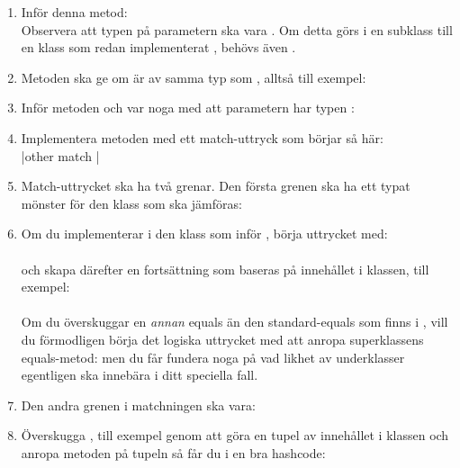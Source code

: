 \begin{enumerate}[leftmargin=*]
\item Inför denna metod: \\Observera att typen på parametern ska vara . Om detta görs i en subklass till en klass som redan implementerat , behövs även .

\item Metoden  ska ge  om  är av samma typ som , alltså till exempel: \\

\item Inför metoden  och var noga med att parametern har typen : \\ 

\item Implementera metoden  med ett match-uttryck som börjar så här: \\
\code|other match |

\item Match-uttrycket ska ha två grenar. Den första grenen ska ha ett typat mönster för den klass som ska jämföras: \\ 

\item Om du implementerar  i den klass som inför , börja uttrycket med: \\  \\
och skapa därefter en fortsättning som baseras på innehållet i klassen, till exempel: \\  \\
Om du överskuggar en \textit{annan} equals än den standard-equals som finns i , vill du förmodligen börja det logiska uttrycket med att anropa superklassens equals-metod:
  men du får fundera noga på vad likhet av underklasser egentligen ska innebära i ditt speciella fall.

\item Den andra grenen i matchningen ska vara:

\item Överskugga , till exempel genom att göra en tupel av innehållet i klassen och anropa metoden \code{##} på tupeln så får du i en bra hashcode: \\

\end{enumerate}


